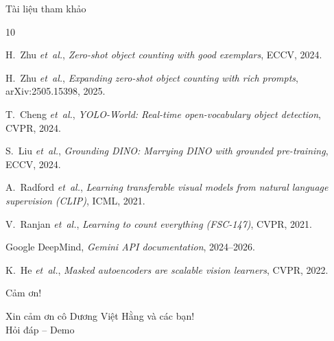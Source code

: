 \documentclass[11pt]{beamer}
\begin{document}
\begin{frame}{Tài liệu tham khảo}
\scriptsize
\begin{thebibliography}{10}

H.~Zhu \emph{et~al.},
\textit{Zero-shot object counting with good exemplars},
ECCV, 2024.

H.~Zhu \emph{et~al.},
\textit{Expanding zero-shot object counting with rich prompts},
arXiv:2505.15398, 2025.

T.~Cheng \emph{et~al.},
\textit{YOLO-World: Real-time open-vocabulary object detection},
CVPR, 2024.

S.~Liu \emph{et~al.},
\textit{Grounding DINO: Marrying DINO with grounded pre-training},
ECCV, 2024.

A.~Radford \emph{et~al.},
\textit{Learning transferable visual models from natural language supervision (CLIP)},
ICML, 2021.

V.~Ranjan \emph{et~al.},
\textit{Learning to count everything (FSC-147)},
CVPR, 2021.

Google DeepMind,
\textit{Gemini API documentation}, 2024--2026.

K.~He \emph{et~al.},
\textit{Masked autoencoders are scalable vision learners},
CVPR, 2022.

\end{thebibliography}
\end{frame}

\begin{frame}{Cảm ơn!}
  \begin{center}
    \Large Xin cảm ơn cô Dương Việt Hằng và các bạn! \\
    \vspace{0.5cm}
    \normalsize Hỏi đáp -- Demo
  \end{center}
\end{frame}
\end{document}
